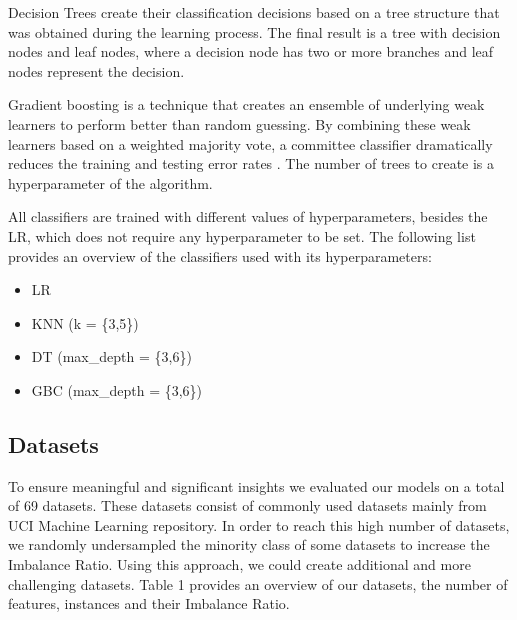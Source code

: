 \documentclass[parskip=full]{scrartcl}
\begin{document}
Decision Trees create their classification decisions based on a tree structure that was 
obtained during the learning process. The final result is a tree with decision nodes and 
leaf nodes, where a decision node has two or more branches and leaf nodes represent the decision.

Gradient boosting is a technique that creates an ensemble of underlying weak learners to 
perform better than random guessing. By combining these weak learners based on a weighted 
majority vote, a committee classifier dramatically reduces the training and testing error 
rates  \cite{Huang2007}. The number of trees to create is a hyperparameter of the algorithm.

All classifiers are trained with different values of hyperparameters, besides the LR, which does 
not require any hyperparameter to be set. The following list provides an overview of the 
classifiers used with its hyperparameters:

\begin{itemize}
  \item LR
  \item KNN (k = \{3,5\})
  \item DT (max\_depth = \{3,6\})
  \item GBC (max\_depth = \{3,6\})
\end{itemize}

\subsection{Datasets}

To ensure meaningful and significant insights we evaluated our models on a total of 69 datasets. 
These datasets consist of commonly used datasets mainly from UCI Machine Learning repository. 
In order to reach this high number of datasets, we randomly undersampled the minority class of 
some datasets to increase the Imbalance Ratio. Using this approach, we could create additional 
and more challenging datasets. Table 1 provides an overview of our datasets, the number of 
features, instances and their Imbalance Ratio.
\end{document}
